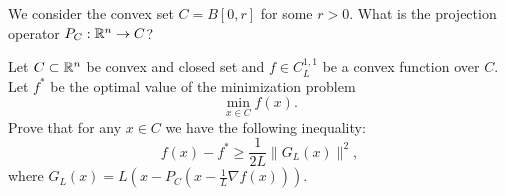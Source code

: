 \documentclass{ExerciseSheet}
\newif\ifsolutions
\begin{document}
\fi

\vskip 0.5cm

\begin{exo}
We consider the convex set $C=B[0, r]$ for some $r>0$. What is the projection operator $P_C:\mathbb{R}^n \rightarrow C$?
\end{exo}

\ifsolutions
\vskip 0.3cm
\begin{solution}
\end{solution}

\fi

\vskip 0.5cm
\begin{exo}
Let $C\subset \mathbb{R}^n$ be convex and closed set and $f\in C^{1,1}_L$ be a convex function over $C$. Let $f^*$ be the optimal value of the minimization problem 
\begin{equation*}
    \min_{x\in C} f(x).
\end{equation*}
Prove that for any $x\in C$ we have the following inequality:
\begin{equation*}
    f(x) - f^* \geq \frac{1}{2L} \|G_L(x)\|^2,
\end{equation*}
where $G_L(x) = L (x-P_C(x-\frac{1}{L} \nabla f(x)))$.
\end{exo}


\ifsolutions
\vskip 0.3cm
\begin{solution}
Follows directly by the Decrease Lemma for Convex Constrained Problems with $t= \frac{1}{L}$ and using that $f^*$ is the minimum.
Question where do we need that $f$ is convex?
\end{solution}
\fi
\end{document}
